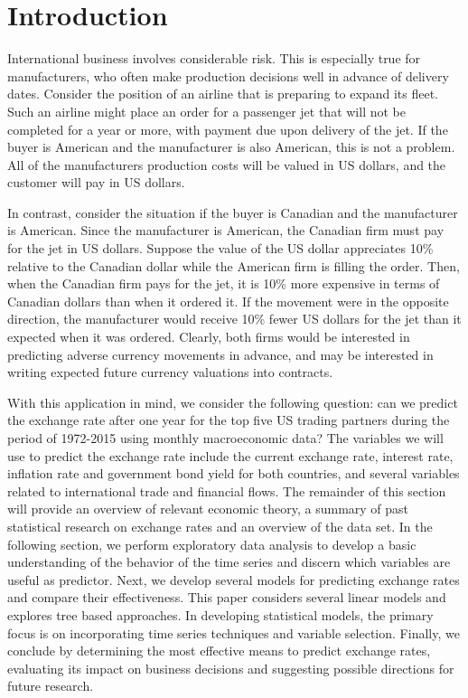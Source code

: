 \documentclass{sig-alternate-05-2015}
\begin{document}
\section{Introduction}
International business involves considerable risk. This is especially true for manufacturers, who often make production decisions well in advance of delivery dates. Consider the position of an airline that is preparing to expand its fleet. Such an airline might place an order for a passenger jet that will not be completed for a year or more, with payment due upon delivery of the jet. If the buyer is American and the manufacturer is also American, this is not a problem. All of the manufacturers production costs will be valued in US dollars, and the customer will pay in US dollars.
\par{} In contrast, consider the situation if the buyer is Canadian and the manufacturer is American. Since the manufacturer is American, the Canadian firm must pay for the jet in US dollars. Suppose the value of the US dollar appreciates 10\% relative to the Canadian dollar while the American firm is filling the order. Then, when the Canadian firm pays for the jet, it is 10\% more expensive in terms of Canadian dollars than when it ordered it. If the movement were in the opposite direction, the manufacturer would receive 10\% fewer US dollars for the jet than it expected when it was ordered. Clearly, both firms would be interested in predicting adverse currency movements in advance, and may be interested in writing expected future currency valuations into contracts. 
\par{} With this application in mind, we consider the following question: can we predict the exchange rate after one year for the top five US trading partners during the period of 1972-2015 using monthly macroeconomic data? The variables we will use to predict the exchange rate include the current exchange rate, interest rate, inflation rate and government bond yield for both countries, and several variables related to international trade and financial flows. The remainder of this section will provide an overview of relevant economic theory, a summary of past statistical research on exchange rates and an overview of the data set. In the following section, we perform exploratory data analysis to develop a basic understanding of the behavior of the time series and discern which variables are useful as predictor. Next, we develop several models for predicting exchange rates and compare their effectiveness. This paper considers several linear models and explores tree based approaches. In developing statistical models, the primary focus is on incorporating time series techniques and variable selection. Finally, we conclude by determining the most effective means to predict exchange rates, evaluating its impact on business decisions and suggesting possible directions for future research.
\end{document}
